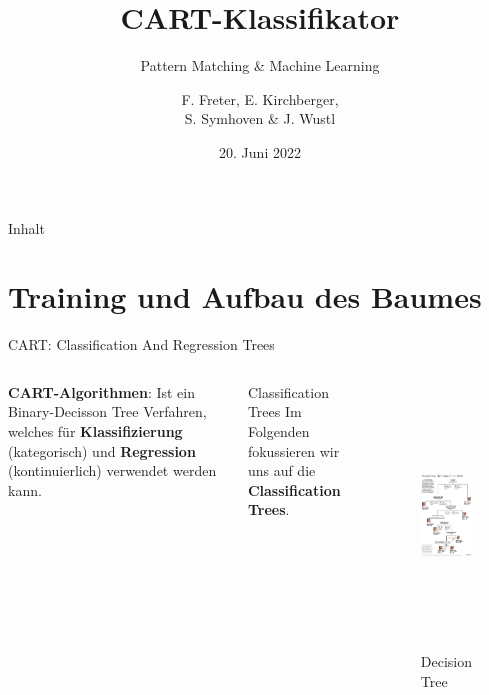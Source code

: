 \documentclass{beamer}
\title{CART-Klassifikator}
\subtitle{Pattern Matching \& Machine Learning}
\author{F. Freter, E. Kirchberger,\\S. Symhoven \& J. Wustl}
\institute{Sommersemester 2023}
\date{20. Juni 2022}
\begin{document}

\begin{frame}
	\maketitle %
\end{frame}


\begin{frame}{Inhalt}
	\tableofcontents %
\end{frame}




\section{Training und Aufbau des Baumes}
 
\begin{frame}{CART: Classification And Regression Trees}
	\begin{columns}
			\textbf{CART-Algorithmen}: Ist ein Binary-Decisson Tree Verfahren, welches für \textbf{Klassifizierung} (kategorisch) und \textbf{Regression} (kontinuierlich) verwendet werden kann.
			
			\begin{alertblock}{Classification Trees}
				Im Folgenden fokussieren wir uns auf die  \textbf{Classification Trees}.
			\end{alertblock}
			
			\begin{figure}
				\includegraphics[height=7cm]{Images/0416-nat-subOBAMA.jpg}
				\caption{Decision Tree \cite{hastie_tibshirani_friedman}}
			\end{figure}
	\end{columns}
		
	
\end{frame}
\end{document}
